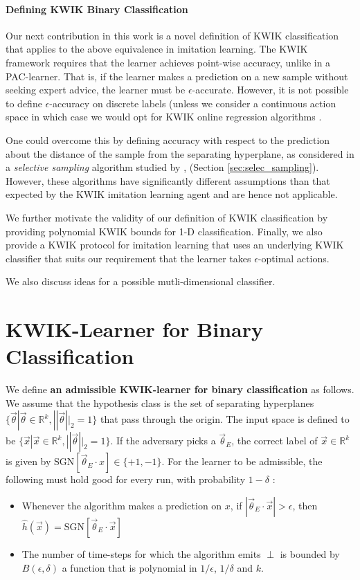 \paragraph{Defining KWIK Binary Classification}
Our next contribution in this work is a novel definition of KWIK classification that applies to the above equivalence in imitation learning. The KWIK framework requires that the learner achieves point-wise accuracy, unlike in a PAC-learner. That is, if the learner makes a prediction on a new sample without seeking expert advice, the learner must be $\epsilon$-accurate. However, it is not possible to define $\epsilon$-accuracy on discrete labels (unless we consider a continuous action space in which case we would opt for KWIK online regression algorithms \citet{DBLP:conf/nips/StrehlL07}. 

One could overcome this by defining accuracy with respect to the prediction about the distance of the sample from the separating hyperplane, as considered in a \textit{selective sampling} algorithm studied by  \citet{Cesa-Bianchi:2009:RBC:1553374.1553390}, \citet{Dekel:2012:SSA:2503308.2503327} (Section \ref{sec:selec_sampling}). However, these algorithms have significantly different assumptions than that expected by the KWIK imitation learning agent and are hence not applicable. 

We further motivate the validity of our definition of KWIK classification by providing polynomial KWIK bounds for 1-D classification. Finally, we also provide a KWIK protocol for imitation learning that uses an underlying KWIK classifier that suits our requirement that the learner takes $\epsilon$-optimal actions.

We also discuss ideas for a possible mutli-dimensional classifier. 


\section{KWIK-Learner for Binary Classification}

\begin{dfn} We define \textbf{an admissible KWIK-learner for binary classification} as follows. We assume that the hypothesis class is the set of separating hyperplanes $\{\vec{\theta} | \vec{\theta} \in \mathbb{R}^k, ||\vec{\theta}||_2 =  1\}$ that pass through the origin.
The input space is defined to be $\{\vec{x} | \vec{x} \in \mathbb{R}^k, ||\vec{\theta}||_2 = 1\}$.
 If the adversary picks a $\vec{\theta}_E$, the correct label of $\vec{x} \in \mathbb{R}^k$ is given by $\text{SGN}[\vec{\theta}_E \cdot x] \in \{+1, -1\}$. For the learner to be admissible, the following must hold good for every run, with probability $1-\delta$ : 
\begin{itemize}
\item Whenever the algorithm makes a prediction on $x$, if $|\vec{\theta}_E \cdot \vec{x}| > \epsilon$, then $\hat{h}(\vec{x}) = \text{SGN}[\vec{\theta}_E \cdot \vec{x}]$
\item The number of time-steps for which the algorithm emits $\perp$ is bounded by $B(\epsilon,\delta)$ a function that is polynomial in $1/\epsilon$, $1/\delta$ and $k$.
\end{itemize}
\end{dfn}

